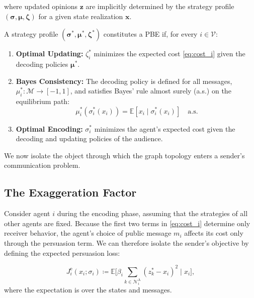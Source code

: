 \documentclass[journal,twoside,web]{ieeecolor}
\begin{document}
\noindent where updated opinions $\bm{z}$ are implicitly determined by the strategy profile $(\bm{\sigma}, \bm{\mu}, \bm{\zeta})$ for a given state realization $\bm{x}$.
\begin{definition}
    \label{def:pbe}
    A strategy profile $(\boldsymbol{\sigma}^*, \boldsymbol{\mu}^*, \boldsymbol{\zeta}^*)$ constitutes a PBE if, for every $i \in \mathcal{V}$:
    \begin{enumerate}[wide]
        \item \textbf{Optimal Updating:} $\zeta_i^*$ minimizes the expected cost \eqref{eq:cost_i} given the decoding policies $\boldsymbol{\mu}^*$.
        \item \textbf{Bayes Consistency:} The decoding policy is defined for all messages, $\mu_i^* : \mathcal{M} \to [-1,1]$, and satisfies Bayes' rule almost surely (a.s.) on the equilibrium path:
              \[
                  \mu_i^*(\sigma_i^*(x_i))
                  =
                  \mathbb E[x_i\mid \sigma_i^*(x_i)] \quad\text{a.s.}
              \]
        \item \textbf{Optimal Encoding:} $\sigma_i^*$ minimizes the agent's expected cost given the decoding and updating policies of the audience.
    \end{enumerate}
\end{definition}

We now isolate the object through which the graph topology enters a sender's communication problem.

\subsection{The Exaggeration Factor}
\label{subsec:graph_induced_exaggeration}

Consider agent $i$ during the encoding phase, assuming that the strategies of all other agents are fixed. Because the first two terms in \eqref{eq:cost_i} determine only receiver behavior, the agent's choice of public message $m_i$ affects its cost only through the persuasion term. We can therefore isolate the sender's objective by defining the expected persuasion loss:

\begin{equation}
    \label{eq:sender_loss}
    J^{\mathrm{e}}_i(x_i;\sigma_i) \coloneqq
    \mathbb E\Big[\beta_i\sum_{k\in\mathcal N_i^{\mathrm A}}(z_k^*-x_i)^2\;\Big|\; x_i
        \Big],
\end{equation}
where the expectation is over the states and messages.
\end{document}
